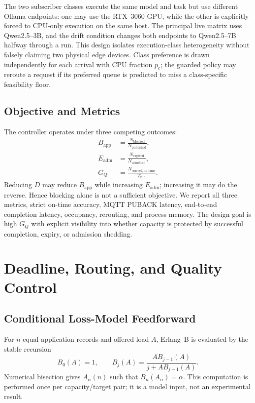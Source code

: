 \documentclass[journal]{IEEEtran}
\begin{document}
The two subscriber classes execute the same model and task but use different Ollama endpoints: one may use the RTX~3060 GPU, while the other is explicitly forced to CPU-only execution on the same host. The principal live matrix uses Qwen2.5--3B, and the drift condition changes both endpoints to Qwen2.5--7B halfway through a run. This design isolates execution-class heterogeneity without falsely claiming two physical edge devices. Class preference is drawn independently for each arrival with CPU fraction $p_c$; the guarded policy may reroute a request if its preferred queue is predicted to miss a class-specific feasibility floor.

\subsection{Objective and Metrics}

The controller operates under three competing outcomes:
\begin{align}
 B_{\mathrm{app}} &= \frac{N_{\mathrm{blocked}}}{N_{\mathrm{published}}},\\
 E_{\mathrm{adm}} &= \frac{N_{\mathrm{expired}}}{N_{\mathrm{admitted}}},\\
 G_Q &= \frac{N_{\mathrm{correct,on\mbox{-}time}}}{T_{\mathrm{run}}}.
\end{align}
Reducing $D$ may reduce $B_{\mathrm{app}}$ while increasing $E_{\mathrm{adm}}$; increasing it may do the reverse. Hence blocking alone is not a sufficient objective. We report all three metrics, strict on-time accuracy, MQTT PUBACK latency, end-to-end completion latency, occupancy, rerouting, and process memory. The design goal is high $G_Q$ with explicit visibility into whether capacity is protected by successful completion, expiry, or admission shedding.
\section{Deadline, Routing, and Quality Control}
\label{sec:controller}

\subsection{Conditional Loss-Model Feedforward}

For $n$ equal application records and offered load $A$, Erlang--B is evaluated by the stable recursion
\begin{equation}
 B_0(A)=1,\qquad B_j(A)=\frac{A B_{j-1}(A)}{j+A B_{j-1}(A)}.
 \label{eq:erlang-recursion}
\end{equation}
Numerical bisection gives $A_\alpha(n)$ such that $B_n(A_\alpha)=\alpha$. This computation is performed once per capacity/target pair; it is a model input, not an experimental result.
\end{document}
